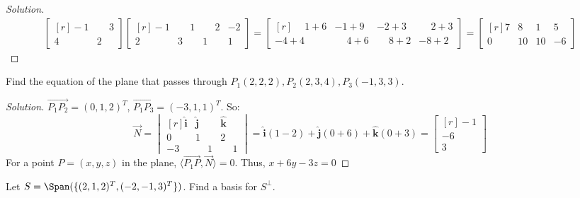 \documentclass[crop=false,class=book,oneside]{standalone}
\begin{document}
        \begin{proof}[Solution]
        \begin{align*}
            \begin{bmatrix*}[r] -1 & \phantom{-}3 \\ 4 & 2 \end{bmatrix*} \begin{bmatrix*}[r] -1 & \phantom{-}1 & \phantom{-}2 & -2 \\ 2 & 3 & 1 & 1 \end{bmatrix*}=\begin{bmatrix*}[r] \phantom{-}1+6 & -1+9 & -2+3 & \phantom{-}2+3 \\ -4+4 & \phantom{-}4+6 & \phantom{-}8+2 & -8+2 \end{bmatrix*}=\begin{bmatrix*}[r] 7 & 8 & 1 & 5 \\ 0 & 10 & 10 & -6 \end{bmatrix*}
        \end{align*}
        \end{proof}
        \begin{problem}
        Find the equation of the plane that passes through $P_1(2,2,2), P_2(2,3,4), P_3(-1,3,3)$.
        \end{problem}
        \begin{proof}[Solution]
        $\overrightarrow{P_1P_2} = (0,1,2)^{T}$, $\overrightarrow{P_1 P_3} = (-3,1,1)^{T}$. So:
        \begin{equation*}
            \overrightarrow{N} = \begin{vmatrix*}[r] \hat{\mathbf{i}} & \hat{\mathbf{j}} & \hat{\mathbf{k}} \\ 0 & 1 & 2 \\ -3 & \phantom{-}1 & \phantom{-}1 \end{vmatrix*} = \hat{\mathbf{i}}(1-2) + \hat{\mathbf{j}}(0+6) + \hat{\mathbf{k}}(0+3)=\begin{bmatrix*}[r]-1 \\ -6 \\ 3\end{bmatrix*}   
        \end{equation*}
        For a point $P=(x,y,z)$ in the plane, $\langle \overrightarrow{P_1P}, \overrightarrow{N}\rangle = 0$. Thus, $x + 6y - 3z =0$
        \end{proof}
        \begin{problem}
        Let $S=\Span(\{(2,1,2)^T, (-2,-1,3)^T\})$. Find a basis for $S^{\perp}$.
        \end{problem}
\end{document}
